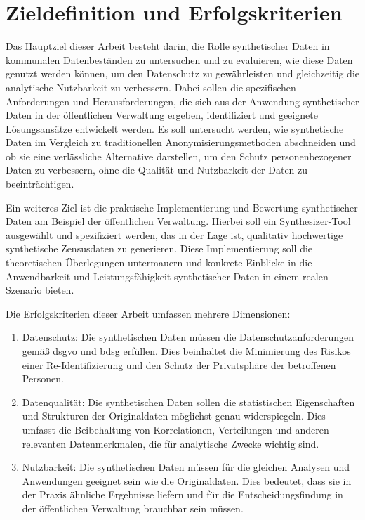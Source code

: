 \section{Zieldefinition und Erfolgskriterien}
\begin{spacing}{1.5}

Das Hauptziel dieser Arbeit besteht darin, die Rolle synthetischer Daten in kommunalen Datenbeständen zu untersuchen und zu evaluieren, wie diese Daten genutzt werden können, um den Datenschutz zu gewährleisten und gleichzeitig die analytische Nutzbarkeit zu verbessern. Dabei sollen die spezifischen Anforderungen und Herausforderungen, die sich aus der Anwendung synthetischer Daten in der öffentlichen Verwaltung ergeben, identifiziert und geeignete Lösungsansätze entwickelt werden. Es soll untersucht werden, wie synthetische Daten im Vergleich zu traditionellen Anonymisierungsmethoden abschneiden und ob sie eine verlässliche Alternative darstellen, um den Schutz personenbezogener Daten zu verbessern, ohne die Qualität und Nutzbarkeit der Daten zu beeinträchtigen.

Ein weiteres Ziel ist die praktische Implementierung und Bewertung synthetischer Daten am Beispiel der öffentlichen Verwaltung. Hierbei soll ein Synthesizer-Tool ausgewählt und spezifiziert werden, das in der Lage ist, qualitativ hochwertige synthetische Zensusdaten zu generieren. Diese Implementierung soll die theoretischen Überlegungen untermauern und konkrete Einblicke in die Anwendbarkeit und Leistungsfähigkeit synthetischer Daten in einem realen Szenario bieten.

Die Erfolgskriterien dieser Arbeit umfassen mehrere Dimensionen:

\begin{enumerate}
    \item Datenschutz: Die synthetischen Daten müssen die Datenschutzanforderungen gemäß \acrshort{dsgvo} und \acrshort{bdsg} erfüllen. Dies beinhaltet die Minimierung des Risikos einer Re-Identifizierung und den Schutz der Privatsphäre der betroffenen Personen.
    \item Datenqualität: Die synthetischen Daten sollen die statistischen Eigenschaften und Strukturen der Originaldaten möglichst genau widerspiegeln. Dies umfasst die Beibehaltung von Korrelationen, Verteilungen und anderen relevanten Datenmerkmalen, die für analytische Zwecke wichtig sind.\newpage
    \item Nutzbarkeit: Die synthetischen Daten müssen für die gleichen Analysen und Anwendungen geeignet sein wie die Originaldaten. Dies bedeutet, dass sie in der Praxis ähnliche Ergebnisse liefern und für die Entscheidungsfindung in der öffentlichen Verwaltung brauchbar sein müssen.
\end{enumerate}


\end{spacing}
